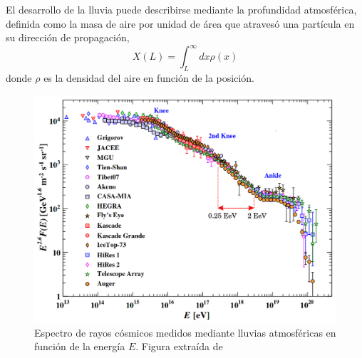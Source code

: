 El desarrollo de la lluvia puede describirse mediante la profundidad atmosférica, definida como la masa de aire por unidad de área que atravesó una partícula en su dirección de propagación, 
\begin{equation}
	X(L)= \int_L^\infty dx \rho(x)
\end{equation}
donde $\rho$ es la densidad del aire en función de la posición.

\begin{figure}[H]
	\centering
	\includegraphics[width=\textwidth]{auger_spectrum_v2.png}
	\caption{Espectro de rayos cósmicos medidos mediante lluvias atmosféricas en función de la energía $E$. Figura extraída de \cite{PGD}}
	\label{fig:spectra}
\end{figure}